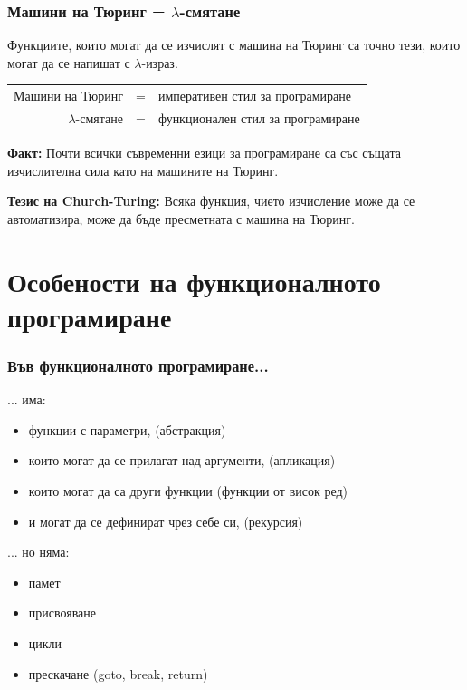 \documentclass{beamer}
\begin{document}
\begin{frame}
  \frametitle{Машини на Тюринг = $\lambda$-смятане}

  \begin{theorem}
  Функциите, които могат да се изчислят с машина на Тюринг са точно тези, които могат да се напишат с $\lambda$-израз.
  \end{theorem}

  \pause

  \begin{center}
    \begin{tabular}{|rcl|}
      \hline
      Машини на Тюринг & = & императивен стил за програмиране\\
      $\lambda$-смятане & = & функционален стил за програмиране\\
      \hline
    \end{tabular}
  \end{center}

  \pause

  \textbf{Факт: }Почти всички съвременни езици за програмиране са със същата изчислителна сила като на машините на Тюринг.
  \vspace{1em}

  \pause

  \textbf{Тезис на Church-Turing:} Всяка функция, чието изчисление може да се автоматизира, може да бъде пресметната с машина на Тюринг.
  
\end{frame}

\section*{Особености на функционалното програмиране}

\begin{frame}
  \frametitle{Във функционалното програмиране...}

  ... има:
  \begin{itemize}[<+->]
  \item функции с параметри, (абстракция)
  \item които могат да се прилагат над аргументи, (апликация)
  \item които могат да са други функции (функции от висок ред)
  \item и могат да се дефинират чрез себе си, (рекурсия)
  \end{itemize}
  \vspace{1 em}
  \pause
  ... но няма:
  \begin{itemize}[<+->]
  \item памет
  \item присвояване
  \item цикли
  \item прескачане (goto, break, return)
  \end{itemize}
\end{frame}
\end{document}
